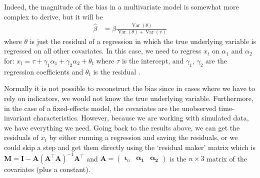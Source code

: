 \documentclass[]{interact}
\theoremstyle{plain}%
\theoremstyle{definition}
\theoremstyle{remark}
\begin{document}
Indeed, the magnitude of the bias in a multivariate model is somewhat
more complex to derive, but it will be \begin{align}
\hat{\beta} & = \beta \frac{\mathop{\mathrm{\mathrm{Var}}}(\theta)}{\mathop{\mathrm{\mathrm{Var}}}(\theta) + \mathop{\mathrm{\mathrm{Var}}}(\upsilon)}
\end{align} where \(\theta\) is just the residual of a regression in
which the true underlying variable is regressed on all other covariates.
In this case, we need to regress \(x_{t}\) on \(\alpha_{1}\) and
\(\alpha_{2}\) for:
\(x_{t} = \tau + \gamma_{1}\alpha_{1} + \gamma_{2}\alpha_{2} + \theta_{t}\)
where \(\tau\) is the intercept, and \(\gamma_{1}\), \(\gamma_{2}\) are
the regression coefficients and \(\theta_{t}\) is the residual
\citep[p.~318--320]{Wooldridge2009}.

Normally it is not possible to reconstruct the bias since in cases where
we have to rely on indicators, we would not know the true underlying
variable. Furthermore, in the case of a fixed-effects model, the
covariates are the unobserved time-invariant characteristics. However,
because we are working with simulated data, we have everything we need.
Going back to the results above, we can get the residuals of \(x_{t}\)
by either running a regression and saving the residuals, or we could
skip a step and get them directly using the `residual maker' matrix
\citep{Ruettenauer2020} which is
\(\bm{M} = \bm{I} - \bm{A}(\bm{A}^{\intercal}\bm{A})^{-1}\bm{A}^{\intercal}\)
and
\(\bm{A} = \begin{pmatrix}\bm{\iota}_{n} & \bm{\alpha_{1}} & \bm{\alpha_{2}}\end{pmatrix}\)
is the \(n \times 3\) matrix of the covariates (plus a constant).

\singlespacing
\end{document}
